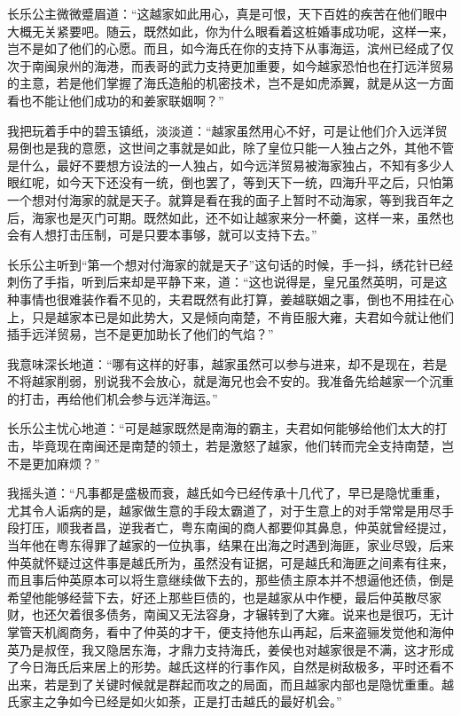 长乐公主微微蹙眉道：“这越家如此用心，真是可恨，天下百姓的疾苦在他们眼中大概无关紧要吧。随云，既然如此，你为什么眼看着这桩婚事成功呢，这样一来，岂不是如了他们的心愿。而且，如今海氏在你的支持下从事海运，滨州已经成了仅次于南闽泉州的海港，而表哥的武力支持更加重要，如今越家恐怕也在打远洋贸易的主意，若是他们掌握了海氏造船的机密技术，岂不是如虎添翼，就是从这一方面看也不能让他们成功的和姜家联姻啊？”

我把玩着手中的碧玉镇纸，淡淡道：“越家虽然用心不好，可是让他们介入远洋贸易倒也是我的意愿，这世间之事就是如此，除了皇位只能一人独占之外，其他不管是什么，最好不要想方设法的一人独占，如今远洋贸易被海家独占，不知有多少人眼红呢，如今天下还没有一统，倒也罢了，等到天下一统，四海升平之后，只怕第一个想对付海家的就是天子。就算是看在我的面子上暂时不动海家，等到我百年之后，海家也是灭门可期。既然如此，还不如让越家来分一杯羹，这样一来，虽然也会有人想打击压制，可是只要本事够，就可以支持下去。”

长乐公主听到“第一个想对付海家的就是天子”这句话的时候，手一抖，绣花针已经刺伤了手指，听到后来却是平静下来，道：“这也说得是，皇兄虽然英明，可是这种事情也很难装作看不见的，夫君既然有此打算，姜越联姻之事，倒也不用挂在心上，只是越家本已是如此势大，又是倾向南楚，不肯臣服大雍，夫君如今就让他们插手远洋贸易，岂不是更加助长了他们的气焰？”

我意味深长地道：“哪有这样的好事，越家虽然可以参与进来，却不是现在，若是不将越家削弱，别说我不会放心，就是海兄也会不安的。我准备先给越家一个沉重的打击，再给他们机会参与远洋海运。”

长乐公主忧心地道：“可是越家既然是南海的霸主，夫君如何能够给他们太大的打击，毕竟现在南闽还是南楚的领土，若是激怒了越家，他们转而完全支持南楚，岂不是更加麻烦？”

我摇头道：“凡事都是盛极而衰，越氏如今已经传承十几代了，早已是隐忧重重，尤其令人诟病的是，越家做生意的手段太霸道了，对于生意上的对手常常是用尽手段打压，顺我者昌，逆我者亡，粤东南闽的商人都要仰其鼻息，仲英就曾经提过，当年他在粤东得罪了越家的一位执事，结果在出海之时遇到海匪，家业尽毁，后来仲英就怀疑过这件事是越氏所为，虽然没有证据，可是越氏和海匪之间素有往来，而且事后仲英原本可以将生意继续做下去的，那些债主原本并不想逼他还债，倒是希望他能够经营下去，好还上那些巨债的，也是越家从中作梗，最后仲英散尽家财，也还欠着很多债务，南闽又无法容身，才辗转到了大雍。说来也是很巧，无计掌管天机阁商务，看中了仲英的才干，便支持他东山再起，后来盗骊发觉他和海仲英乃是叔侄，我又隐居东海，才鼎力支持海氏，姜侯也对越家很是不满，这才形成了今日海氏后来居上的形势。越氏这样的行事作风，自然是树敌极多，平时还看不出来，若是到了关键时候就是群起而攻之的局面，而且越家内部也是隐忧重重。越氏家主之争如今已经是如火如荼，正是打击越氏的最好机会。”

